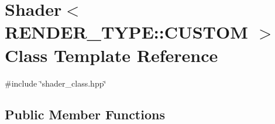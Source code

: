 \hypertarget{classShader_3_01RENDER__TYPE_1_1CUSTOM_01_4}{}\section{Shader$<$ R\+E\+N\+D\+E\+R\+\_\+\+T\+Y\+PE\+:\+:C\+U\+S\+T\+OM $>$ Class Template Reference}
\label{classShader_3_01RENDER__TYPE_1_1CUSTOM_01_4}


{\ttfamily \#include \char`\"{}shader\+\_\+class.\+hpp\char`\"{}}

\subsection*{Public Member Functions}
